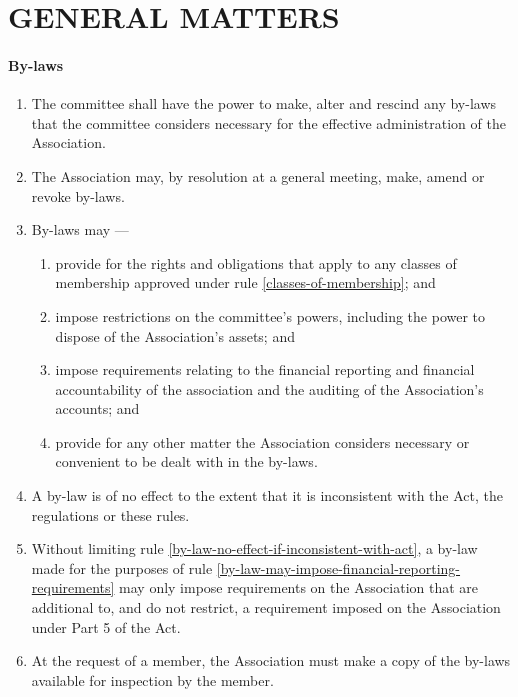 \documentclass[../constitution.tex]{subfiles}
\begin{document}
\hypertarget{part-8-general-matters}{%
  \part{GENERAL MATTERS}\label{part-8-general-matters}}

\hypertarget{by-laws}{%
  \subsection{By-laws}\label{by-laws}}

\begin{enumerate}

  \item The committee shall have the power to make, alter and rescind any by-laws that the committee considers necessary for the effective administration of the Association.
  \item The Association may, by resolution at a general meeting, make, amend or revoke by-laws.
  \item By-laws may ---

        \begin{enumerate}

          \item provide for the rights and obligations that apply to any classes of membership approved under rule \ref{classes-of-membership}; and
          \item impose restrictions on the committee's powers, including the power to dispose of the Association's assets; and
          \item impose requirements relating to the financial reporting and financial accountability of the association and the auditing of the Association's accounts; and \label{by-law-may-impose-financial-reporting-requirements}
          \item provide for any other matter the Association considers necessary or convenient to be dealt with in the by-laws.
        \end{enumerate}
  \item A by-law is of no effect to the extent that it is inconsistent with the Act, the regulations or these rules. \label{by-law-no-effect-if-inconsistent-with-act}
  \item Without limiting rule \ref{by-law-no-effect-if-inconsistent-with-act}, a by-law made for the purposes of rule \ref{by-law-may-impose-financial-reporting-requirements} may only impose requirements on the Association that are additional to, and do not restrict, a requirement imposed on the Association under Part 5 of the Act.
  \item At the request of a member, the Association must make a copy of the by-laws available for inspection by the member.
\end{enumerate}
\end{document}
